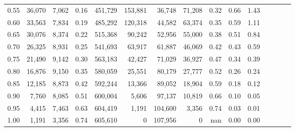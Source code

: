 \begin{tabular}{rrrcrrrrrrrrrrr}
0.55 &  36,070 &  7,062 &                                       0.16 &  451,729 &  153,881 &   36,748 &   71,208 &  0.32 &  0.66 &                         1.43 \\
0.60 &  33,563 &  7,834 &                                       0.19 &  485,292 &  120,318 &   44,582 &   63,374 &  0.35 &  0.59 &                         1.11 \\
0.65 &  30,076 &  8,374 &                                       0.22 &  515,368 &   90,242 &   52,956 &   55,000 &  0.38 &  0.51 &                         0.84 \\
0.70 &  26,325 &  8,931 &                                       0.25 &  541,693 &   63,917 &   61,887 &   46,069 &  0.42 &  0.43 &                         0.59 \\
0.75 &  21,490 &  9,142 &                                       0.30 &  563,183 &   42,427 &   71,029 &   36,927 &  0.47 &  0.34 &                         0.39 \\
0.80 &  16,876 &  9,150 &                                       0.35 &  580,059 &   25,551 &   80,179 &   27,777 &  0.52 &  0.26 &                         0.24 \\
0.85 &  12,185 &  8,873 &                                       0.42 &  592,244 &   13,366 &   89,052 &   18,904 &  0.59 &  0.18 &                         0.12 \\
0.90 &   7,760 &  8,085 &                                       0.51 &  600,004 &    5,606 &   97,137 &   10,819 &  0.66 &  0.10 &                         0.05 \\
0.95 &   4,415 &  7,463 &                                       0.63 &  604,419 &    1,191 &  104,600 &    3,356 &  0.74 &  0.03 &                         0.01 \\
1.00 &   1,191 &  3,356 &                                       0.74 &  605,610 &        0 &  107,956 &        0 &   nan &  0.00 &                         0.00 \\
\bottomrule
\end{tabular}
